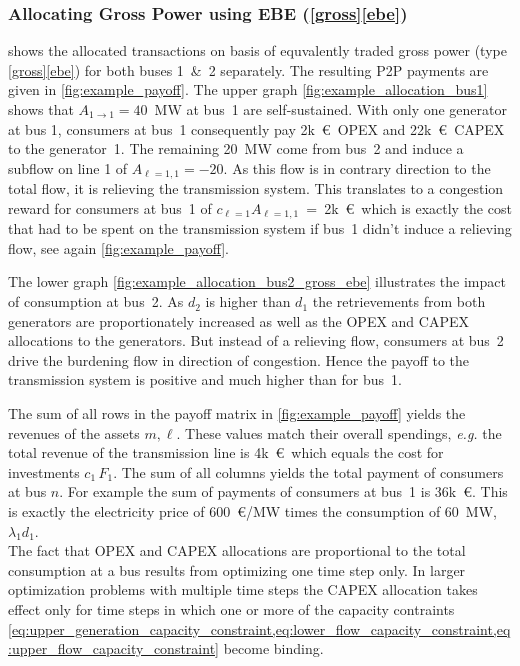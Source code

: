 \documentclass[11pt,twocolumn]{article}
\begin{document}
\subsubsection*{Allocating Gross Power using EBE (\ref{gross}\ref{ebe}) }

 shows the allocated transactions on basis of equvalently traded gross power (type \ref{gross}\ref{ebe}) for both buses 1~\&~2 separately. The resulting P2P payments are given in \cref{fig:example_payoff}.
The upper graph \cref{fig:example_allocation_bus1} shows that $A_{1 \rightarrow 1}=40$~MW at bus~1 are self-sustained. With only one generator at bus 1, consumers at bus~1 consequently pay 2k~\euro~OPEX and 22k~\euro~CAPEX to the generator~1. The remaining 20~MW come from bus~2 and induce a subflow on line 1 of $A_{\ell = 1, 1} = -20$. As this flow is in contrary direction to the total flow, it is relieving the transmission system. This translates to a congestion reward for consumers at bus~1 of $c_{\ell=1} A_{\ell = 1, 1}$~=~2k~\euro\, which is exactly the cost that had to be spent on the transmission system if bus~1 didn't induce a relieving flow, see again \cref{fig:example_payoff}. 



The lower graph \cref{fig:example_allocation_bus2_gross_ebe} illustrates the impact of consumption at bus~2. As $d_2$ is higher than $d_1$ the retrievements from both generators are proportionately increased as well as the OPEX and CAPEX allocations to the generators. But instead of a relieving flow, consumers at bus~2 drive the burdening flow in direction of congestion. Hence the payoff to the transmission system is positive and much higher than for bus~1.

The sum of all rows in the payoff matrix in \cref{fig:example_payoff} yields the revenues of the assets $m, \ell$. These values match their overall spendings, \textit{e.g.} the total revenue of the transmission line is 4k~\euro\, which equals the cost for investments $c_{1}\,F_{1}$. The sum of all columns yields the total payment of consumers at bus $n$. For example the sum of payments of consumers at bus~1 is 36k~\euro. This is exactly the electricity price of 600~\euro/MW times the consumption of 60~MW, $\lambda_1 d_1$. \\

The fact that OPEX and CAPEX allocations are proportional to the total consumption at a bus results from optimizing one time step only. In larger optimization problems with multiple time steps the CAPEX allocation takes effect only for time steps in which one or more of the capacity contraints  \cref{eq:upper_generation_capacity_constraint,eq:lower_flow_capacity_constraint,eq:upper_flow_capacity_constraint} become binding.  
\end{document}
